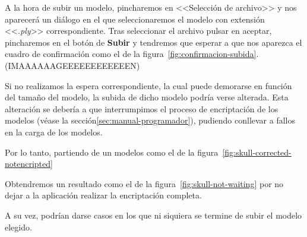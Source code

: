 A la hora de subir un modelo, pincharemos en <<Selección de archivo>> y nos aparecerá un diálogo en el que seleccionaremos el modelo con extensión <<\textit{.ply}>> correspondiente. Tras seleccionar el archivo pulsar en aceptar, pincharemos en el botón de \textbf{Subir} y tendremos que esperar a que nos aparezca el cuadro de confirmación como el de la figura~\ref{fig:confirmacion-subida}.
(IMAAAAAAGEEEEEEEEEEEEN)

Si no realizamos la espera correspondiente, la cual puede demorarse en función del tamaño del modelo, la subida de dicho modelo podría verse alterada. Esta alteración se debería a que interrumpimos el proceso de encriptación de los modelos (véase la sección\ref{sec:manual-programador}), pudiendo conllevar a fallos en la carga de los modelos.

Por lo tanto, partiendo de un modelos como el de la figura~\ref{fig:skull-corrected-notencripted}

Obtendremos un resultado como el de la figura~\ref{fig:skull-not-waiting} por no dejar a la aplicación realizar la encriptación completa.

A su vez, podrían darse casos en los que ni siquiera se termine de subir el modelo elegido.